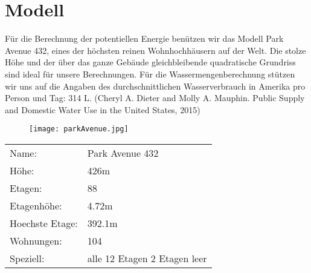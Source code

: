 \section{Modell}
Für die Berechnung der potentiellen Energie benützen wir das Modell Park Avenue 432, eines der höchsten reinen Wohnhochhäusern auf der Welt. Die stolze Höhe und der über das ganze Gebäude gleichbleibende quadratische Grundriss sind ideal für unsere Berechnungen. Für die Wassermengenberechnung stützen wir uns auf die Angaben des durchschnittlichen Wasserverbrauch in Amerika pro Person und Tag: 314 L. (Cheryl A. Dieter and Molly A. Mauphin. Public Supply and Domestic Water Use in the United States, 2015)
\begin{figure}[H]
\centering
\texttt{[image: parkAvenue.jpg]}

\end{figure}
\begin{table}[H]
\begin{tabular}{ll}
Name:				& Park Avenue 432\\
Höhe: 				& 426m\\          
Etagen:				& 88\\
Etagenhöhe:			&4.72m\\
Hoechste Etage:		&392.1m\\
Wohnungen:			&104\\
Speziell:			&alle 12 Etagen 2 Etagen leer\\           
\end{tabular}
\end{table}
